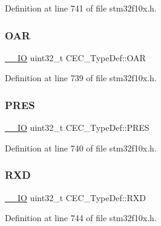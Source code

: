 Definition at line 741 of file stm32f10x.\+h.

\mbox{\label{struct_c_e_c___type_def_aa578935e8a0795a0a7494f4d281bc43d}} 
\subsubsection{\texorpdfstring{O\+AR}{OAR}}
{\footnotesize\ttfamily \hyperlink{core__sc300_8h_aec43007d9998a0a0e01faede4133d6be}{\+\_\+\+\_\+\+IO} uint32\+\_\+t C\+E\+C\+\_\+\+Type\+Def\+::\+O\+AR}



Definition at line 739 of file stm32f10x.\+h.

\mbox{\label{struct_c_e_c___type_def_a2e1d5865f3d49a195e58f265b425256e}} 
\subsubsection{\texorpdfstring{P\+R\+ES}{PRES}}
{\footnotesize\ttfamily \hyperlink{core__sc300_8h_aec43007d9998a0a0e01faede4133d6be}{\+\_\+\+\_\+\+IO} uint32\+\_\+t C\+E\+C\+\_\+\+Type\+Def\+::\+P\+R\+ES}



Definition at line 740 of file stm32f10x.\+h.

\mbox{\label{struct_c_e_c___type_def_a13d5b0e5228d5cca9f7c5d8533705d21}} 
\subsubsection{\texorpdfstring{R\+XD}{RXD}}
{\footnotesize\ttfamily \hyperlink{core__sc300_8h_aec43007d9998a0a0e01faede4133d6be}{\+\_\+\+\_\+\+IO} uint32\+\_\+t C\+E\+C\+\_\+\+Type\+Def\+::\+R\+XD}



Definition at line 744 of file stm32f10x.\+h.

\mbox{\label{struct_c_e_c___type_def_a462a952588fc45732d4545dbe79356da}} 
